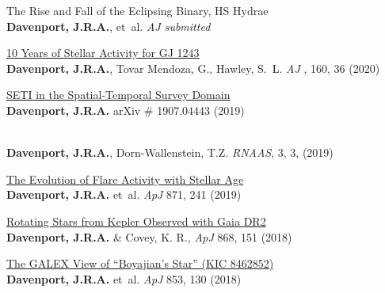 \documentclass{article}
\begin{document}
\begin{llist}
\clearpage



\begin{etaremune}[leftmargin=10pt]


\item{\sc The Rise and Fall of the Eclipsing Binary, HS Hydrae}\\
{\bf Davenport, J.R.A.}, et~al. {\em AJ submitted}


\item{\sc \href{https://arxiv.org/abs/2005.10281}{\color{blue}10 Years of Stellar Activity for GJ 1243}}\\
{\bf Davenport, J.R.A.}, Tovar Mendoza, G., Hawley, S.~L. {\em AJ }, 160, 36 (2020)



\item{\sc \href{https://arxiv.org/abs/1907.04443}{\color{blue}SETI in the Spatial-Temporal Survey Domain}}\\
{\bf Davenport, J.R.A.} arXiv \# 1907.04443 (2019)


\item{}\\
{\bf Davenport, J.R.A.}, Dorn-Wallenstein, T.Z. {\em RNAAS}, 3, 3, (2019)


\item{\sc \href{https://arxiv.org/abs/1901.00890}{\color{blue}The Evolution of Flare Activity with Stellar Age}}\\
{\bf Davenport, J.R.A.} et~al.  {\em ApJ} 871, 241 (2019)

\item{\sc \href{https://arxiv.org/abs/1807.09841}{\color{blue} Rotating Stars from Kepler Observed with Gaia DR2}}\\
{\bf Davenport, J.R.A.} \& Covey, K. R., {\em ApJ} 868, 151 (2018)


\item{\sc \href{https://arxiv.org/abs/1712.04948}{\color{blue}The GALEX View of ``Boyajian's Star'' (KIC 8462852)}}\\
{\bf Davenport, J.R.A.} et~al. {\em ApJ} 853, 130 (2018)


\end{etaremune}
\end{llist}
\end{document}
